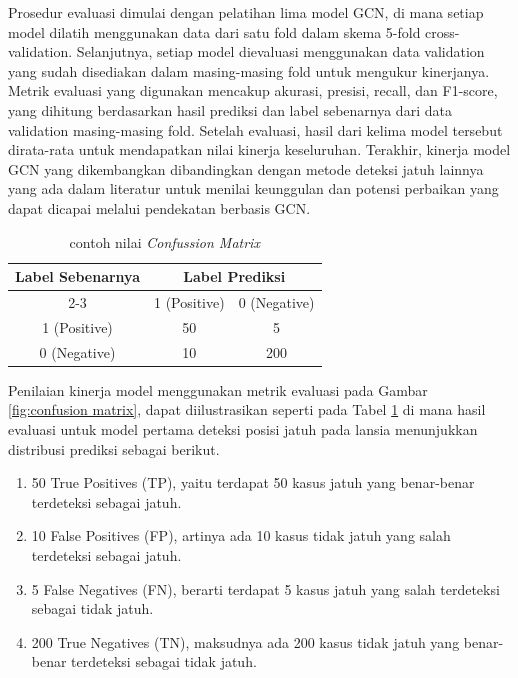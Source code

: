 Prosedur evaluasi dimulai dengan pelatihan lima model GCN, di mana setiap model dilatih menggunakan data dari satu fold dalam skema 5-fold cross-validation. Selanjutnya, setiap model dievaluasi menggunakan data validation yang sudah disediakan dalam masing-masing fold untuk mengukur kinerjanya. Metrik evaluasi yang digunakan mencakup akurasi, presisi, recall, dan F1-score, yang dihitung berdasarkan hasil prediksi dan label sebenarnya dari data validation masing-masing fold. Setelah evaluasi, hasil dari kelima model tersebut dirata-rata untuk mendapatkan nilai kinerja keseluruhan. Terakhir, kinerja model GCN yang dikembangkan dibandingkan dengan metode deteksi jatuh lainnya yang ada dalam literatur untuk menilai keunggulan dan potensi perbaikan yang dapat dicapai melalui pendekatan berbasis GCN. \par
\vspace{10pt}

\begin{table}[h!]
\centering
\begin{tabular}{|c|c|c|}
\hline
\multirow{2}{*}{\textbf{Label Sebenarnya}} & \multicolumn{2}{c|}{\textbf{Label Prediksi}} \\
\cline{2-3} 
 & 1 (Positive) & 0 (Negative) \\
\hline
1 (Positive) & 50 & 5 \\
\hline
0 (Negative) & 10 & 200 \\
\hline
\end{tabular}
\caption{contoh nilai \textit{Confussion Matrix}}
\label{table:3.contoh confusion matrix}
\end{table}

Penilaian kinerja model menggunakan metrik evaluasi pada Gambar \ref{fig:confusion matrix}, dapat diilustrasikan seperti pada Tabel \ref{table:3.contoh confusion matrix} di mana hasil evaluasi untuk model pertama deteksi posisi jatuh pada lansia menunjukkan distribusi prediksi sebagai berikut.
\begin{enumerate}
    \item 50 True Positives (TP), yaitu terdapat 50 kasus jatuh yang benar-benar terdeteksi sebagai jatuh.
    \item 10 False Positives (FP), artinya ada 10 kasus tidak jatuh yang salah terdeteksi sebagai jatuh.
    \item 5 False Negatives (FN), berarti terdapat 5 kasus jatuh yang salah terdeteksi sebagai tidak jatuh.
    \item 200 True Negatives (TN), maksudnya ada 200 kasus tidak jatuh yang benar-benar terdeteksi sebagai tidak jatuh.
\end{enumerate}

